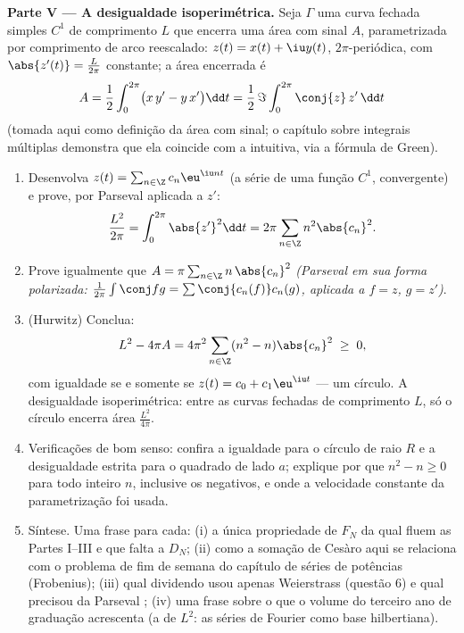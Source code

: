 \begin{problem}
\medskip
\noindent\textbf{Parte V --- A desigualdade isoperimétrica.} Seja
$\Gamma$ uma curva fechada simples $C^1$ de comprimento $L$ que encerra
uma área com sinal $A$, parametrizada por comprimento de arco reescalado: $z(t) =
x(t) + \iu y(t)$, $2\pi$-periódica, com $\abs{z'(t)} =
\frac{L}{2\pi}$ constante; a área encerrada é
\[
A = \frac12\int_0^{2\pi}\bigl(x\,y' - y\,x'\bigr)\dd t
= \frac{1}{2}\,\Im\int_0^{2\pi}\conj{z}\,z'\,\dd t
\]
(tomada aqui como definição da área com sinal; o capítulo
sobre integrais múltiplas demonstra que ela coincide com a intuitiva,
via a fórmula de Green).
\begin{enumerate}[resume]
  \item Desenvolva $z(t) = \sum_{n\in\Z}c_n\eu^{\iu nt}$ (a
        série de uma função $C^1$,  convergente) e
        prove, por Parseval aplicada a $z'$:
        \[
        \frac{L^2}{2\pi} = \int_0^{2\pi}\abs{z'}^2\dd t
        = 2\pi\sum_{n\in\Z}n^2\abs{c_n}^2 .
        \]
  \item Prove igualmente que $A = \pi\sum_{n\in\Z}
        n\,\abs{c_n}^2$ \emph{(Parseval em sua forma polarizada:
        $\frac{1}{2\pi}\int\conj f g = \sum
        \conj{c_n(f)}c_n(g)$, aplicada a $f = z$, $g = z'$)}.
  \item (Hurwitz) Conclua:
        \[
        L^2 - 4\pi A = 4\pi^2\sum_{n\in\Z}
        (n^2 - n)\abs{c_n}^2 \;\geq\; 0 ,
        \]
        com igualdade se e somente se $z(t) = c_0 +
        c_1\eu^{\iu t}$ --- um círculo. A desigualdade
        isoperimétrica: entre as curvas fechadas de comprimento $L$, só
        o círculo encerra área $\frac{L^2}{4\pi}$.
  \item Verificações de bom senso: confira a igualdade para o círculo de
        raio $R$ e a desigualdade estrita para o quadrado de
        lado $a$; explique por que $n^2 - n \geq 0$ para todo
        inteiro $n$, inclusive os negativos, e onde a
        velocidade constante da parametrização foi usada.
  \item Síntese. Uma frase para cada: (i) a única
        propriedade de $F_N$ da qual fluem as Partes I--III e
        que falta a $D_N$; (ii) como a somação de Cesàro aqui
        se relaciona com o problema de fim de semana do capítulo de séries de potências
        (Frobenius); (iii) qual dividendo usou apenas
        Weierstrass (questão 6) e qual precisou da Parseval
        ; (iv) uma frase sobre o que o volume do terceiro ano de graduação
        acrescenta (a  de $L^2$: as séries de Fourier como base
        hilbertiana).
\end{enumerate}
\end{problem}
